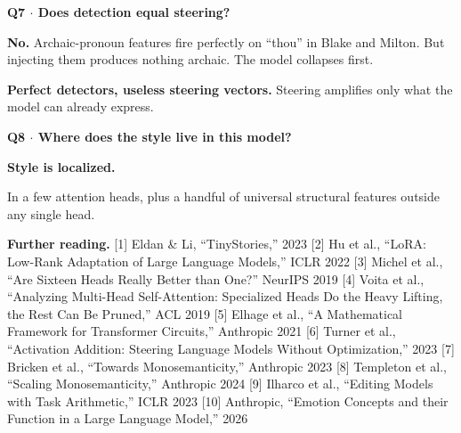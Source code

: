 \documentclass[a0,landscape]{a0poster}
\newcommand{\qtitle}[1]{{\Large\bfseries\color{accBlack}#1}\par\medskip}
\begin{document}
\begin{minipage}[t][\textheight][t]{\textwidth}
\begin{minipage}[t]{0.29\textwidth}
  \vspace{6mm}

  \begin{qpanel}[accOrange]
    \qtitle{Q7 $\cdot$ Does detection equal steering?}
    \textbf{No.} Archaic-pronoun features fire perfectly on ``thou'' in Blake and Milton. But injecting them produces nothing archaic. The model collapses first.

    \textbf{Perfect detectors, useless steering vectors.} Steering amplifies only what the model can already express.
  \end{qpanel}

  \vspace{6mm}

  \begin{qpanel}[accRed]
    \qtitle{Q8 $\cdot$ Where does the style live in this model?}
    {\bfseries Style is localized.}

    \vspace{1mm}
    In a few attention heads, plus a handful of universal structural features outside any single head.
  \end{qpanel}

\end{minipage}

\vspace{6mm}

\noindent
\begin{tcolorbox}[enhanced, arc=4mm,
  colback=panelBg, colframe=panelBg, boxrule=0pt,
  left=6mm, right=6mm, top=3mm, bottom=3mm,
  borderline west={3mm}{0mm}{mutedText}]
  {\footnotesize\color{mutedText}
  \textbf{Further reading.}\;
  {}[1] Eldan \& Li, ``TinyStories,'' 2023 \quad
  {}[2] Hu et al., ``LoRA: Low-Rank Adaptation of Large Language Models,'' ICLR 2022 \quad
  {}[3] Michel et al., ``Are Sixteen Heads Really Better than One?'' NeurIPS 2019 \quad
  {}[4] Voita et al., ``Analyzing Multi-Head Self-Attention: Specialized Heads Do the Heavy Lifting, the Rest Can Be Pruned,'' ACL 2019 \quad
  {}[5] Elhage et al., ``A Mathematical Framework for Transformer Circuits,'' Anthropic 2021 \quad
  {}[6] Turner et al., ``Activation Addition: Steering Language Models Without Optimization,'' 2023 \quad
  {}[7] Bricken et al., ``Towards Monosemanticity,'' Anthropic 2023 \quad
  {}[8] Templeton et al., ``Scaling Monosemanticity,'' Anthropic 2024 \quad
  {}[9] Ilharco et al., ``Editing Models with Task Arithmetic,'' ICLR 2023 \quad
  {}[10] Anthropic, ``Emotion Concepts and their Function in a Large Language Model,'' 2026
  \par}
\end{tcolorbox}


\end{minipage}
\end{document}
